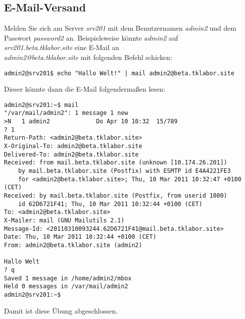 \subsection{E-Mail-Versand}
Melden Sie sich am Server \textit{srv201} mit dem Benutzernamen \textit{admin2}
und dem Passwort \textit{password2} an. Beispielsweise könnte \textit{admin2}
auf
\\
\textit{srv201.beta.tklabor.site} eine E-Mail an \\
\textit{admin2@beta.tklabor.site} mit folgenden Befehl schicken:

\begin{lstlisting}
admin2@srv201$ echo "Hallo Welt!" | mail admin2@beta.tklabor.site
\end{lstlisting}

Dieser könnte dann die E-Mail folgendermaßen lesen:
\begin{scriptsize}
\begin{lstlisting}
admin2@srv201:~$ mail
"/var/mail/admin2": 1 message 1 new
>N   1 admin2             Do Apr 10 10:32  15/789   
? 1
Return-Path: <admin2@beta.tklabor.site>
X-Original-To: admin2@beta.tklabor.site
Delivered-To: admin2@beta.tklabor.site
Received: from mail.beta.tklabor.site (unknown [10.174.26.201])
	by mail.beta.tklabor.site (Postfix) with ESMTP id E4A4221FE3
	for <admin2@beta.tklabor.site>; Thu, 10 Mar 2011 10:32:47 +0100 (CET)
Received: by mail.beta.tklabor.site (Postfix, from userid 1000)
	id 62D6721F41; Thu, 10 Mar 2011 10:32:44 +0100 (CET)
To: <admin2@beta.tklabor.site>
X-Mailer: mail (GNU Mailutils 2.1)
Message-Id: <20110310093244.62D6721F41@mail.beta.tklabor.site>
Date: Thu, 10 Mar 2011 10:32:44 +0100 (CET)
From: admin2@beta.tklabor.site (admin2)

Hallo Welt
? q
Saved 1 message in /home/admin2/mbox
Held 0 messages in /var/mail/admin2
admin2@srv201:~$ 
\end{lstlisting}
\end{scriptsize}
Damit ist diese Übung abgeschlossen.
